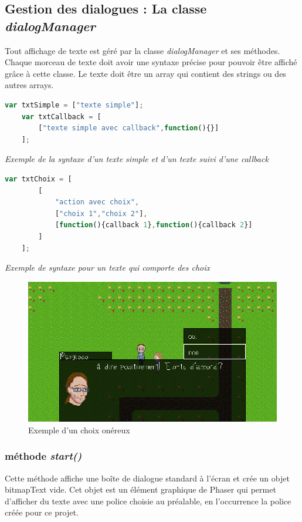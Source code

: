 \documentclass[11pt]{article}
\begin{document}
\begin{appendices}
\subsection{Gestion des dialogues : La classe \textit{dialogManager}}
Tout affichage de texte est géré par la classe \textit{dialogManager} et ses méthodes. 
Chaque morceau de texte doit avoir une syntaxe précise pour pouvoir être affiché grâce à cette classe. Le texte doit être un array qui contient des strings ou des autres arrays.
\begin{lstlisting}[language=JavaScript]
	var txtSimple = ["texte simple"];
	var txtCallback = [
		["texte simple avec callback",function(){}]
	];
\end{lstlisting}
\textit{Exemple de la syntaxe d'un texte simple et d'un texte suivi d'une callback}\\
\begin{lstlisting}[language=JavaScript]
	var txtChoix = [
		[
			"action avec choix",
			["choix 1","choix 2"],
			[function(){callback 1},function(){callback 2}]
		]
	];
\end{lstlisting} 
\textit{Exemple de syntaxe pour un texte qui comporte des choix}
\begin{figure}[H]
\includegraphics[scale=0.33]{choix}
\centering
\caption{Exemple d'un choix onéreux}

\end{figure}
\subsubsection{méthode \textit{start()}}
Cette méthode affiche une boîte de dialogue standard à l'écran et crée un objet bitmapText vide. Cet objet est un élément graphique de Phaser qui permet d'afficher du texte avec une police choisie au préalable, en l'occurrence la police créée pour ce projet.

\end{appendices}
\end{document}
